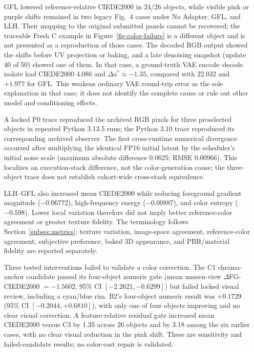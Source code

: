 \documentclass[times,twocolumn,final]{elsarticle}
\providecommand{\DIFadd}[1]{{\protect\color{blue} \sf #1}} %
\providecommand{\DIFaddbegin}{} %
\providecommand{\DIFaddend}{} %
\begin{document}
\DIFadd{GFL lowered reference-relative CIEDE2000 in 24/26 objects, while visible pink or purple shifts remained in two legacy Fig.~4 cases under No Adapter, GFL, and LLH. Their mapping to the original submitted panels cannot be recovered; the traceable Fresh C example in Figure~\ref{fig:color-failure} is a different object and is not presented as a reproduction of those cases. The decoded RGB output showed the shifts before UV projection or baking, and a late denoising snapshot (update 40 of 50) showed one of them. In that case, a ground-truth VAE encode--decode isolate had CIEDE2000 4.086 and $\Delta a^*\approx-1.35$, compared with 22.032 and $+1.977$ for GFL. This weakens ordinary VAE round-trip error as the sole explanation in that case; it does not identify the complete cause or rule out other model and conditioning effects.
}

\DIFadd{A locked P0 trace reproduced the archived RGB pixels for three preselected objects in repeated Python 3.13.5 runs; the Python 3.10 trace reproduced its corresponding archived observer. The first cross-runtime numerical divergence occurred after multiplying the identical FP16 initial latent by the scheduler's initial noise scale (maximum absolute difference 0.0625; RMSE 0.00966). This localizes an execution-stack difference, not the color-generation cause; the three-object trace does not establish cohort-wide cross-stack equivalence.
}

\DIFadd{LLH--GFL also increased mean CIEDE2000 while reducing foreground gradient magnitude ($-0.06772$), }\DIFaddend high-frequency   \DIFaddbegin \DIFadd{energy ($-0.00887$), and color entropy ($-0.598$). Lower local variation therefore did not imply better reference-color agreement or greater texture fidelity. The terminology follows Section~\ref{subsec:metrics}: texture variation}\DIFaddend ,   \DIFaddbegin \DIFadd{image-space agreement, reference-color agreement, subjective preference, baked 3D appearance, and PBR/material fidelity are reported separately.
}

\DIFadd{Three tested interventions failed to validate a color correction. The C1 chroma-anchor candidate passed its four-object numeric gate (mean unseen-view $\Delta$FG-CIEDE2000 $=-1.5602$, 95\% CI $[-2.2621,-0.6299]$) but failed locked visual review, including a cyan/blue rim. B2's four-object numeric result was $+0.1729$ (95\% CI $[-0.2044,+0.6810]$), with only one of four objects improving and no clear visual correction. A feature-relative residual gate increased mean CIEDE2000 versus C3 by 1.35 across 26 objects and by 3.18 among the six earlier cases, with no clear visual reduction in the pink shift. These are sensitivity and failed-candidate results; no color-cast repair is validated.
}
\end{document}

